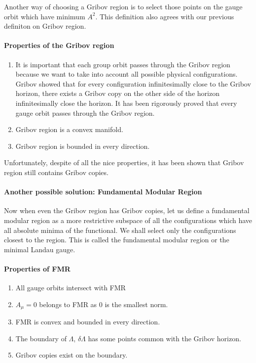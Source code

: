 Another way of choosing a Gribov region is to select those points on the gauge orbit which have minimum $A^{2}$. This definition also agrees with our previous definiton on Gribov region.

\paragraph{Properties of the Gribov region}
\begin{enumerate}
  \item
It is important that each group orbit passes through the Gribov region
because we want to take into account all possible physical
configurations. Gribov showed that for every configuration
infinitesimally close to the Gribov horizon, there exists a Gribov copy
on the other side of the horizon infinitesimally close the horizon. It
has been rigorously proved that every gauge orbit passes through the
Gribov region.
  \item
Gribov region is a convex manifold.
  \item
Gribov region is bounded in every direction.
\end{enumerate}
Unfortunately, despite of all the nice properties, it has been shown
 that Gribov region still contains Gribov copies.

\paragraph{Another possible solution: Fundamental Modular Region}
Now when even the Gribov region has Gribov copies, let us define a
fundamental modular region as a more restrictive subspace of all the
configurations which have all absolute minima of the functional. We
shall select only the configurations closest to the region. This is
called the fundamental modular region or the minimal Landau gauge.

\paragraph{Properties of FMR}
\begin{enumerate}
  \item
All gauge orbits intersect with FMR
  \item
$ A_{\mu}=0 $ belongs to FMR as 0 is the smallest norm.
  \item
FMR is convex and bounded in every direction.
  \item
The boundary of $\Lambda$, $\delta \Lambda$ has some points common with
the Gribov horizon.
  \item Gribov copies exist on the boundary.
\end{enumerate}

